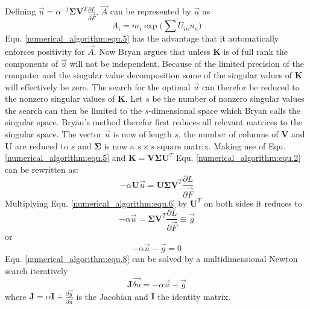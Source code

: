 Defining $\vec u = \alpha^{-1} \mathbf{\Sigma} \mathbf{V}^T \frac{\partial L}{\partial \vec F}$, $\vec A$ can be represented by $\vec u$ as
\begin{equation}
	A_i = m_i \exp \Big(\sum U_{in}u_n\Big)
	\label{numerical_algorithm:equ.5}
\end{equation}
Equ. \ref{numerical_algorithm:equ.5} has the advantage that it automatically enforces positivity for $\vec A$.\newline
Now Bryan argues that unless $\mathbf{K}$ is of full rank the components of $\vec u$ will not be independent.
Because of the limited precision of the computer and the singular value decomposition some of the singular values of $\mathbf{K}$ will effectively be zero.
The search for the optimal $\vec u$ can therefor be reduced to the nonzero singular values of $\mathbf{K}$.\newline
Let $s$ be the number of nonzero singular values the search can then be limited to the $s$-dimensional space which Bryan calls the singular space. 
Bryan's method therefor first reduces all relevant matrices to the singular space.
The vector $\vec u$ is now of length $s$, the number of columns of $\mathbf{V}$ and $\mathbf{U}$ are reduced to $s$ and $\mathbf{\Sigma}$ is now a $s \times s$ square matrix.\newline
Making use of Equ. \ref{numerical_algorithm:equ.5} and $\mathbf{K} = \mathbf{V} \mathbf{\Sigma} \mathbf{U}^T$ Equ. \ref{numerical_algorithm:equ.2} can be rewritten as:
\begin{equation}
	-\alpha \mathbf{U} \vec u = \mathbf{U} \mathbf{\Sigma} \mathbf{V}^T \frac{\partial L}{\partial \vec F}
	\label{numerical_algorithm:equ.6}
\end{equation}
Multiplying Equ. \ref{numerical_algorithm:equ.6} by $\mathbf{U}^T$ on both sides it reduces to
\begin{equation}
	-\alpha \vec u = \mathbf{\Sigma} \mathbf{V}^T \frac{\partial L}{\partial \vec F} \equiv \vec g 
	\label{numerical_algorithm:equ.7}
\end{equation}
or
\begin{equation}
	-\alpha \vec u - \vec g = 0
	\label{numerical_algorithm:equ.8}
\end{equation}
Equ. \ref{numerical_algorithm:equ.8} can be solved by a multidimensional Newton search iteratively
\begin{equation}
	\mathbf{J} \vec{\delta u} = -\alpha \vec u - \vec g
	\label{numerical_algorithm:equ.9}
\end{equation}
where $\mathbf{J} = \alpha \mathbf{I} + \frac{\partial \vec g}{\partial \vec u}$ is the Jacobian and $\mathbf{I}$ the identity matrix. 
